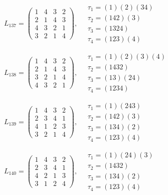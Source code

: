 $L_{137} = \begin{pmatrix} 1 & 4 & 3 & 2 \\ 2 & 1 & 4 & 3 \\ 4 & 3 & 2 & 1 \\ 3 & 2 & 1 & 4 \end{pmatrix}, \quad \begin{matrix} \tau_{1} = (1)(2)(3 4) \\ \tau_{2} = (1 4 2)(3) \\ \tau_{3} = (1 3 2 4) \\ \tau_{4} = (1 2 3)(4) \end{matrix}$

$L_{138} = \begin{pmatrix} 1 & 4 & 3 & 2 \\ 2 & 1 & 4 & 3 \\ 3 & 2 & 1 & 4 \\ 4 & 3 & 2 & 1 \end{pmatrix}, \quad \begin{matrix} \tau_{1} = (1)(2)(3)(4) \\ \tau_{2} = (1 4 3 2) \\ \tau_{3} = (1 3)(2 4) \\ \tau_{4} = (1 2 3 4) \end{matrix}$

$L_{139} = \begin{pmatrix} 1 & 4 & 3 & 2 \\ 2 & 3 & 4 & 1 \\ 4 & 1 & 2 & 3 \\ 3 & 2 & 1 & 4 \end{pmatrix}, \quad \begin{matrix} \tau_{1} = (1)(2 4 3) \\ \tau_{2} = (1 4 2)(3) \\ \tau_{3} = (1 3 4)(2) \\ \tau_{4} = (1 2 3)(4) \end{matrix}$

$L_{140} = \begin{pmatrix} 1 & 4 & 3 & 2 \\ 2 & 3 & 4 & 1 \\ 4 & 2 & 1 & 3 \\ 3 & 1 & 2 & 4 \end{pmatrix}, \quad \begin{matrix} \tau_{1} = (1)(2 4)(3) \\ \tau_{2} = (1 4 3 2) \\ \tau_{3} = (1 3 4)(2) \\ \tau_{4} = (1 2 3)(4) \end{matrix}$

